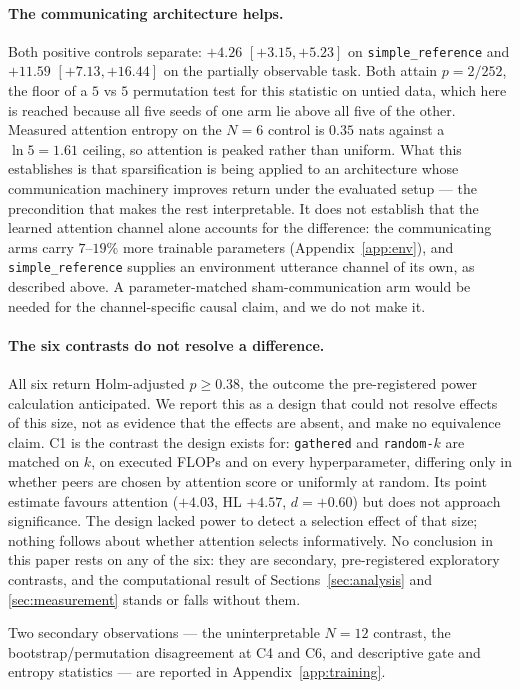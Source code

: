 \paragraph{The communicating architecture helps.} Both positive controls
separate: $+4.26$ $[+3.15, +5.23]$ on \texttt{simple\_reference} and $+11.59$
$[+7.13, +16.44]$ on the partially observable task. Both attain $p = 2/252$,
the floor of a $5$ vs $5$ permutation test for this statistic on untied data,
which here is reached because all five seeds of one arm lie above all five of
the other. Measured attention
entropy on the $N{=}6$ control is $0.35$ nats against a $\ln 5 = 1.61$ ceiling,
so attention is peaked rather than uniform. What this establishes is that
sparsification is being applied to an architecture whose communication
machinery improves return under the evaluated setup --- the precondition that
makes the rest interpretable. It does not establish that the learned attention
channel alone accounts for the difference: the communicating arms carry
$7$--$19\%$ more trainable parameters (Appendix~\ref{app:env}), and
\texttt{simple\_reference} supplies an environment utterance channel of its
own, as described above. A
parameter-matched sham-communication arm would be needed for the
channel-specific causal claim, and we do not make it.

\paragraph{The six contrasts do not resolve a difference.} All six return
Holm-adjusted $p \ge 0.38$, the outcome the pre-registered power calculation
anticipated. We report this as a design that could not resolve effects of this
size, not as evidence that the effects are absent, and make no equivalence
claim. C1 is the contrast the design exists for: \texttt{gathered} and
\texttt{random-}$k$ are matched on $k$, on executed FLOPs and on every
hyperparameter, differing only in whether peers are chosen by attention score
or uniformly at random. Its point estimate favours attention ($+4.03$, HL
$+4.57$, $d = +0.60$) but does not approach significance. The design lacked
power to detect a selection effect of that size; nothing follows about whether
attention selects informatively. No conclusion in this paper rests on any of
the six: they are secondary, pre-registered exploratory contrasts, and the
computational result of Sections~\ref{sec:analysis} and \ref{sec:measurement}
stands or falls without them.

Two secondary observations --- the uninterpretable $N{=}12$ contrast, the
bootstrap/permutation disagreement at C4 and C6, and descriptive gate and
entropy statistics --- are reported in Appendix~\ref{app:training}.
